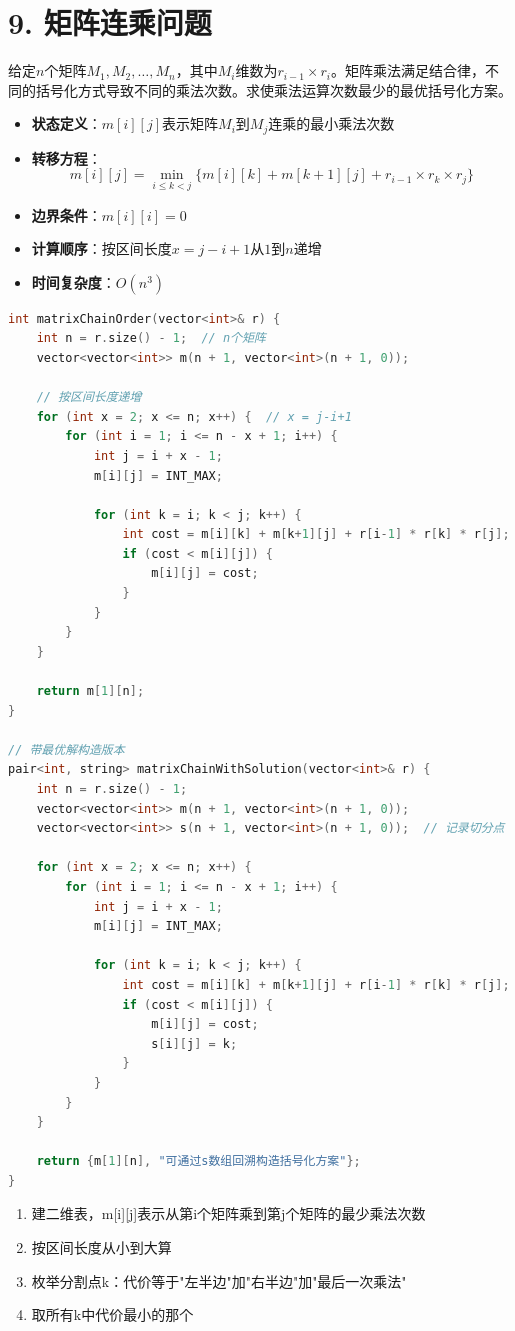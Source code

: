 \section*{9. 矩阵连乘问题}

给定$n$个矩阵$M_1, M_2, \ldots, M_n$，其中$M_i$维数为$r_{i-1} \times r_i$。矩阵乘法满足结合律，不同的括号化方式导致不同的乘法次数。求使乘法运算次数最少的最优括号化方案。



\begin{itemize}
    \item \textbf{状态定义}：$m[i][j]$表示矩阵$M_i$到$M_j$连乘的最小乘法次数
    \item \textbf{转移方程}：$$m[i][j] = \min_{i \le k < j} \{m[i][k] + m[k+1][j] + r_{i-1} \times r_k \times r_j\}$$
    \item \textbf{边界条件}：$m[i][i] = 0$
    \item \textbf{计算顺序}：按区间长度$x = j-i+1$从$1$到$n$递增
    \item \textbf{时间复杂度}：$O(n^3)$
\end{itemize}
\begin{lstlisting}[language=C++, style=cppstyle]
int matrixChainOrder(vector<int>& r) {
    int n = r.size() - 1;  // n个矩阵
    vector<vector<int>> m(n + 1, vector<int>(n + 1, 0));

    // 按区间长度递增
    for (int x = 2; x <= n; x++) {  // x = j-i+1
        for (int i = 1; i <= n - x + 1; i++) {
            int j = i + x - 1;
            m[i][j] = INT_MAX;

            for (int k = i; k < j; k++) {
                int cost = m[i][k] + m[k+1][j] + r[i-1] * r[k] * r[j];
                if (cost < m[i][j]) {
                    m[i][j] = cost;
                }
            }
        }
    }

    return m[1][n];
}

// 带最优解构造版本
pair<int, string> matrixChainWithSolution(vector<int>& r) {
    int n = r.size() - 1;
    vector<vector<int>> m(n + 1, vector<int>(n + 1, 0));
    vector<vector<int>> s(n + 1, vector<int>(n + 1, 0));  // 记录切分点

    for (int x = 2; x <= n; x++) {
        for (int i = 1; i <= n - x + 1; i++) {
            int j = i + x - 1;
            m[i][j] = INT_MAX;

            for (int k = i; k < j; k++) {
                int cost = m[i][k] + m[k+1][j] + r[i-1] * r[k] * r[j];
                if (cost < m[i][j]) {
                    m[i][j] = cost;
                    s[i][j] = k;
                }
            }
        }
    }

    return {m[1][n], "可通过s数组回溯构造括号化方案"};
}
\end{lstlisting}


\begin{enumerate}
    \item 建二维表，m[i][j]表示从第i个矩阵乘到第j个矩阵的最少乘法次数
    \item 按区间长度从小到大算
    \item 枚举分割点k：代价等于"左半边"加"右半边"加"最后一次乘法"
    \item 取所有k中代价最小的那个
\end{enumerate}

